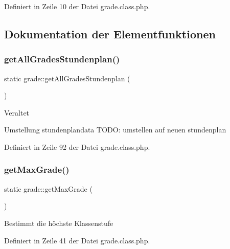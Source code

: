 Definiert in Zeile 10 der Datei grade.\+class.\+php.



\subsection{Dokumentation der Elementfunktionen}
\mbox{\label{classgrade_aff8e296e9340096f5b67eee893570a43}} 
\subsubsection{\texorpdfstring{get\+All\+Grades\+Stundenplan()}{getAllGradesStundenplan()}}
{\footnotesize\ttfamily static grade\+::get\+All\+Grades\+Stundenplan (\begin{DoxyParamCaption}{ }\end{DoxyParamCaption})\hspace{0.3cm}{\ttfamily [static]}}

\begin{DoxyRefDesc}{Veraltet}
\item[\mbox{\hyperlink{deprecated__deprecated000014}{Veraltet}}]Umstellung stundenplandata T\+O\+DO\+: umstellen auf neuen stundenplan \end{DoxyRefDesc}


Definiert in Zeile 92 der Datei grade.\+class.\+php.

\mbox{\label{classgrade_ac93d7d41cb50a82bee5ded1fbd5a75aa}} 
\subsubsection{\texorpdfstring{get\+Max\+Grade()}{getMaxGrade()}}
{\footnotesize\ttfamily static grade\+::get\+Max\+Grade (\begin{DoxyParamCaption}{ }\end{DoxyParamCaption})\hspace{0.3cm}{\ttfamily [static]}}

Bestimmt die höchste Klassenstufe 

Definiert in Zeile 41 der Datei grade.\+class.\+php.

\mbox{\label{classgrade_a822f994d13a560b46f3edef3b824a45e}} 
